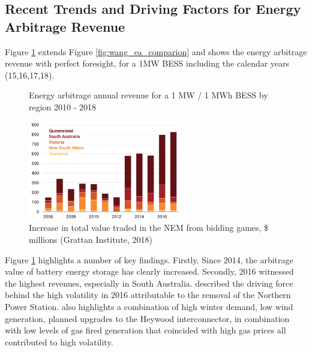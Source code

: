 \subsection{ Recent Trends and Driving Factors for Energy Arbitrage Revenue }
\label{sec:trends}
Figure \ref{fig:wang_plot_full} extends Figure \ref{fig:wang_ea_comparion} and shows the energy arbitrage revenue with perfect foresight, for a 1MW BESS including the calendar years (15,16,17,18). 
\begin{figure}[H]
    \centering
    \caption{Energy arbitrage annual revenue for a 1 MW / 1 MWh BESS by region 2010 - 2018}
    \label{fig:wang_plot_full}
\end{figure}
\begin{figure}
    \begin{center}
        \includegraphics[width=0.6\textwidth]{Pictures/Chapter3/generator_gaming.png}
    \end{center}
    \caption{Increase in total value traded in the NEM from bidding games, \$ millions (Grattan Institute, 2018)}
    \label{fig:generator_gaming}
\end{figure}
Figure \ref{fig:wang_plot_full} highlights a number of key findings. Firstly. Since 2014, the arbitrage value of battery energy storage has clearly increased. 
\newline
Secondly, 2016 witnessed the highest revenues,  especially in South Australia.  \parencite{2016_prices} described the driving force behind the high volatility in 2016 attributable to the removal of the Northern Power Station. \textcite{2016_prices} also highlights a combination of high winter demand, low wind generation, planned upgrades to the Heywood interconnector, in combination with low levels of gas fired generation that coincided with high gas prices all contributed to high volatility.
\newline
